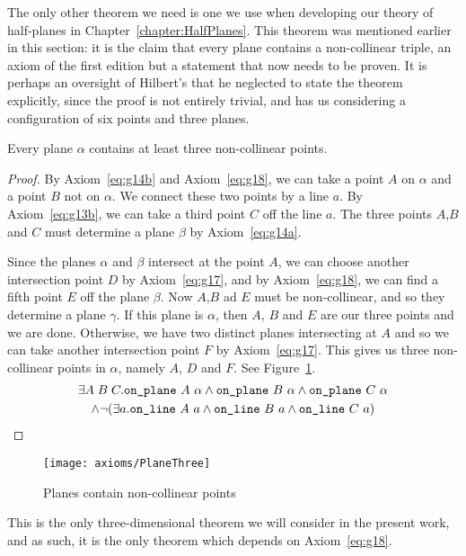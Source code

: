 The only other theorem we need is one we use when developing our theory of half-planes in Chapter~\ref{chapter:HalfPlanes}. This theorem was mentioned earlier in this section: it is the claim that every plane contains a non-collinear triple, an axiom of the first edition but a statement that now needs to be proven. It is perhaps an oversight of Hilbert's that he neglected to state the theorem explicitly, since the proof is not entirely trivial, and has us considering a configuration of six points and three planes.

\label{sec:PlaneThree}
\begin{theorem}\label{eq:PlaneThree}
Every plane $\alpha$ contains at least three non-collinear points.
\end{theorem}
\begin{proof}
By Axiom~\ref{eq:g14b} and Axiom~\ref{eq:g18}, we can take a point $A$ on $\alpha$ and a point $B$ not on $\alpha$. We connect these two points by a line $a$. By Axiom~\ref{eq:g13b}, we can take a third point $C$ off the line $a$. The three points $A$,$B$ and $C$ must determine a plane $\beta$ by Axiom~\ref{eq:g14a}.

Since the planes $\alpha$ and $\beta$ intersect at the point $A$, we can choose another intersection point $D$ by Axiom~\ref{eq:g17}, and by Axiom~\ref{eq:g18}, we can find a fifth point $E$ off the plane $\beta$. Now $A$,$B$ ad $E$ must be non-collinear, and so they determine a plane $\gamma$. If this plane is $\alpha$, then $A$, $B$ and $E$ are our three points and we are done. Otherwise, we have two distinct planes intersecting at $A$ and so we can take another intersection point $F$ by Axiom~\ref{eq:g17}. This gives us three non-collinear points in $\alpha$, namely $A$, $D$ and $F$. See Figure~\ref{fig:PlaneThree}.
\begin{multline}
\exists A\;B\;C. \code{on\_plane}\ A\ \alpha \wedge \code{on\_plane}\ B\ \alpha \wedge \code{on\_plane}\ C\ \alpha\\
\wedge\Triangle{a}{A}{B}{C}
\end{multline}
\end{proof}
\begin{figure}
\centering\texttt{[image: axioms/PlaneThree]}
\caption{Planes contain non-collinear points}
\label{fig:PlaneThree}
\end{figure}

This is the only three-dimensional theorem we will consider in the present work, and as such, it is the only theorem which depends on Axiom~\ref{eq:g18}.

